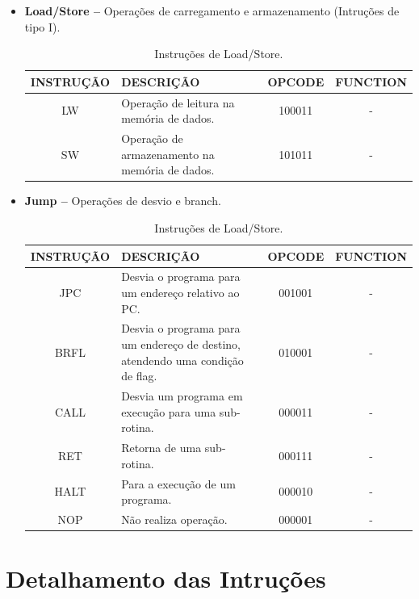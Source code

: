 \documentclass{report}
\begin{document}
\begin{itemize}
    \item \textbf{Load/Store --} Operações de carregamento e armazenamento (Intruções de tipo I).

	\begin{table}[H]
	\centering
	\begin{tabular}{|c|m{6cm}|c|c|}
  	\hline 
  	\textbf{INSTRUÇÃO} & \textbf{DESCRIÇÃO} & \textbf{OPCODE} & \textbf{FUNCTION} \\ 
  	\hline 
  	LW & Operação de leitura na memória de dados. & 100011 & - \\ \hline
  	SW & Operação de armazenamento na memória de dados. & 101011 & - \\ \hline
  	\end{tabular} 
  	\caption{Instruções de Load/Store.}
  \end{table}
    
    \item \textbf{Jump --} Operações de desvio e branch.
    
	\begin{table}[H]
	\centering
	\begin{tabular}{|c|m{6cm}|c|c|}
  	\hline 
  	\textbf{INSTRUÇÃO} & \textbf{DESCRIÇÃO} & \textbf{OPCODE} & \textbf{FUNCTION} \\ 
  	\hline 

  	JPC & Desvia o programa para um endereço relativo ao PC. & 001001 & - \\ \hline
  	BRFL & Desvia o programa para um endereço de destino, atendendo uma condição de flag. & 010001 & - \\ \hline
  	CALL & Desvia um programa em execução para uma sub-rotina. & 000011 & - \\ \hline
  	RET & Retorna de uma sub-rotina. & 000111 & - \\ \hline
  	HALT & Para a execução de um programa. & 000010 & - \\ \hline
  	NOP & Não realiza operação. & 000001 & - \\ \hline

  	\end{tabular} 
  	\caption{Instruções de Load/Store.}
  \end{table}
    
    \end{itemize}

  \section{Detalhamento das Intruções}
  
\end{document}
